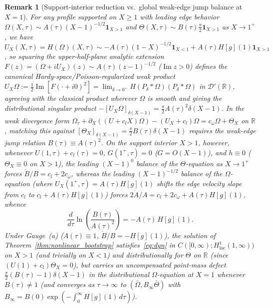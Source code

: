 \documentclass[11pt,a4paper]{article}
\newtheorem{remark}{Remark}
\begin{document}
\begin{remark}[Support-interior reduction vs.\ global weak-edge jump balance at $X=1$]\label{rem:weak_edge_jump}
For any profile supported on $X\ge 1$ with leading edge behavior
$\Omega(X,\tau)\sim A(\tau)(X-1)^{-1/2}\mathbf{1}_{X>1}$ and
$\Theta(X,\tau)\sim B(\tau)\tfrac{\pi}{2}\mathbf{1}_{X>1}$ as $X\to 1^+$, we have
$U_X(X,\tau)=H(\Omega)(X,\tau)\sim -A(\tau)(1-X)^{-1/2}\mathbf{1}_{X<1}+A(\tau)H[g](1)\mathbf{1}_{X>1}$,
so squaring the upper-half-plane analytic extension $F(z)=(\Omega+i U_X)(z)\sim A(\tau)(z-1)^{-1/2}$
($\operatorname{Im}z>0$) defines the canonical Hardy-space/Poisson-regularized weak product
$U_X\Omega:=\tfrac12\operatorname{Im}[F(\cdot+i0)^2]=\lim_{\delta\to 0^+}H(P_\delta*\Omega)(P_\delta*\Omega)$
in $\mathcal{D}'(\mathbb{R})$, agreeing with the classical product wherever $\Omega$ is smooth and
giving the distributional singular product $-[U_X\Omega]_{\delta(X-1)}=\tfrac{\pi}{2}A(\tau)^2\delta(X-1)$.
In the weak divergence form $\Omega_\tau+\partial_X((U+c_l X)\Omega)-(U_X+c_l)\Omega=c_\omega\Omega+\Theta_X$
on $\mathbb{R}$, matching this against $[\Theta_X]_{\delta(X-1)}=\tfrac{\pi}{2}B(\tau)\delta(X-1)$
requires the weak-edge jump relation $B(\tau)\equiv A(\tau)^2$.
On the support interior $X>1$, however, whenever $U(1,\tau)+c_l(\tau)=0$, $G(1^+,\tau)=0$ ($G=O(X-1)$),
and $h\equiv 0$ ($\Theta_X\equiv 0$ on $X>1$), the leading $(X-1)^0$ balance of the $\Theta$-equation as
$X\to 1^+$ forces $\dot B/B=c_l+2c_\omega$, whereas the leading $(X-1)^{-1/2}$ balance of the
$\Omega$-equation (where $U_X(1^+,\tau)=A(\tau)H[g](1)$ shifts the edge velocity slope from $c_l$ to
$c_l+A(\tau)H[g](1)$) forces $2\dot A/A=c_l+2c_\omega+A(\tau)H[g](1)$, whence
\[
\frac{d}{d\tau}\ln\!\left(\frac{B(\tau)}{A(\tau)^2}\right) = -A(\tau)\,H[g](1).
\]
Under Gauge~(a) ($A(\tau)\equiv 1$, $\dot B/B=-H[g](1)$), the solution of
Theorem~\ref{thm:nonlinear_bootstrap} satisfies~\eqref{eq:dyn} in $C([0,\infty);H^1_{\mathrm{loc}}(1,\infty))$ on $X>1$ (and trivially on $X<1$) and distributionally for $\Theta$ on $\mathbb{R}$ (since $(U(1)+c_l)\Theta_X=0$),
but carries an uncompensated point-mass defect $\tfrac{\pi}{2}(B(\tau)-1)\delta(X-1)$ in the
distributional $\Omega$-equation at $X=1$ whenever $B(\tau)\ne 1$ (and converges as $\tau\to\infty$
to $(\bar\Omega,B_\infty\bar\Theta)$ with $B_\infty=B(0)\exp(-\int_0^\infty H[g](1)\,d\tau)$).

\end{remark}
\end{document}
